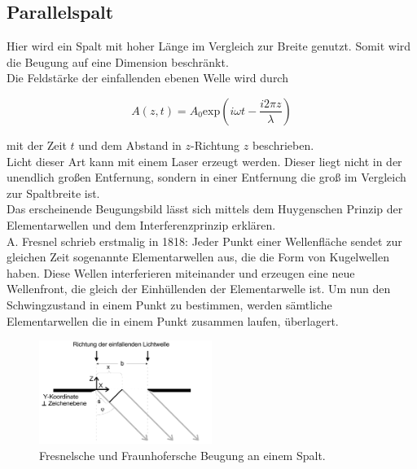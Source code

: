     \subsection{Parallelspalt}

        \noindent Hier wird ein Spalt mit hoher Länge im Vergleich zur Breite genutzt. Somit wird die Beugung auf eine Dimension beschränkt.\\
        Die Feldstärke der einfallenden ebenen Welle wird durch 

        \begin{equation*}
            A(z,t) = A_0 \text{exp}\left(i \omega t - \frac{i 2\pi z}{\lambda}\right)
        \end{equation*}

        \noindent mit der Zeit $t$ und dem Abstand in $z$-Richtung $z$ beschrieben.\\ Licht dieser Art kann mit einem Laser erzeugt werden. 
        Dieser liegt nicht in der unendlich großen Entfernung, sondern in einer Entfernung die groß im Vergleich zur Spaltbreite ist.\\
        Das erscheinende Beugungsbild lässt sich mittels dem Huygenschen Prinzip der Elementarwellen und dem Interferenzprinzip 
        erklären.\\ A. Fresnel schrieb erstmalig in 1818: Jeder Punkt einer Wellenfläche sendet zur gleichen Zeit sogenannte Elementarwellen aus, 
        die die Form von Kugelwellen haben. Diese Wellen interferieren miteinander und erzeugen eine neue Wellenfront, die gleich der Einhüllenden
        der Elementarwelle ist. Um nun den Schwingzustand in einem Punkt zu bestimmen, werden sämtliche Elementarwellen die in einem Punkt zusammen 
        laufen, überlagert.

        \begin{figure}[ht]
            \centering
            \includegraphics[width=0.5\textwidth]{latex/images/einzel.PNG}
            \caption{Fresnelsche und Fraunhofersche Beugung an einem Spalt\protect \cite{V406}.}
            \label{img:einzel}
        \end{figure}

